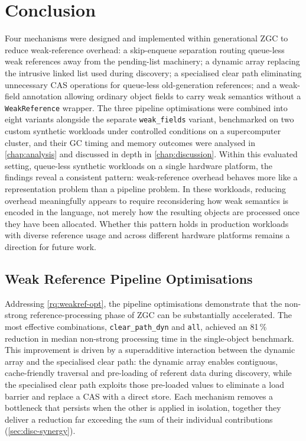 \chapter{Conclusion}
\label{chap:conclusion}

Four mechanisms were designed and implemented within generational \ac{ZGC} to reduce weak-reference overhead: a skip-enqueue separation routing queue-less weak references away from the pending-list machinery; a dynamic array replacing the intrusive linked list used during discovery; a specialised clear path eliminating unnecessary \ac{CAS} operations for queue-less old-generation references; and a weak-field annotation allowing ordinary object fields to carry weak semantics without a \texttt{WeakReference} wrapper. The three pipeline optimisations were combined into eight variants alongside the separate \texttt{weak\_fields} variant, benchmarked on two custom synthetic workloads under controlled conditions on a supercomputer cluster, and their \ac{GC} timing and memory outcomes were analysed in \cref{chap:analysis} and discussed in depth in \cref{chap:discussion}. Within this evaluated setting, queue-less synthetic workloads on a single hardware platform, the findings reveal a consistent pattern: weak-reference overhead behaves more like a representation problem than a pipeline problem. In these workloads, reducing overhead meaningfully appears to require reconsidering how weak semantics is encoded in the language, not merely how the resulting objects are processed once they have been allocated. Whether this pattern holds in production workloads with diverse reference usage and across different hardware platforms remains a direction for future work.

\section{Weak Reference Pipeline Optimisations}
\label{sec:conc-rq1}

Addressing \cref{rq:weakref-opt}, the pipeline optimisations demonstrate that the non-strong reference-processing phase of \ac{ZGC} can be substantially accelerated. The most effective combinations, \texttt{clear\_path\_dyn} and \texttt{all}, achieved an 81\,\% reduction in median non-strong processing time in the single-object benchmark. This improvement is driven by a superadditive interaction between the dynamic array and the specialised clear path: the dynamic array enables contiguous, cache-friendly traversal and pre-loading of referent data during discovery, while the specialised clear path exploits those pre-loaded values to eliminate a load barrier and replace a CAS with a direct store. Each mechanism removes a bottleneck that persists when the other is applied in isolation, together they deliver a reduction far exceeding the sum of their individual contributions (\cref{sec:disc-synergy}).

